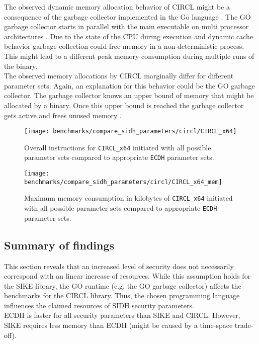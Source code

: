 The observed dynamic memory allocation behavior of \gls{CIRCL} might be a consequence of the garbage collector implemented in the Go language \parencite{Hudson:GGC}. The GO garbage collector starts in parallel with the main executable on multi processor architectures \parencite{go2020faq}. Due to the state of the CPU during execution and dynamic cache behavior garbage collection could free memory in a non-deterministic process. This might lead to a different peak memory consumption during multiple runs of the binary. \\
The observed memory allocations by \gls{CIRCL} marginally differ for different parameter sets. Again, an explanation for this behavior could be the GO garbage collector. The garbage collector knows an upper bound of memory that might be allocated by a binary. Once this upper bound is reached the garbage collector gets active and frees unused memory \parencite{Hudson:GGC}.

\begin{figure}[H]
  \centering
  \texttt{[image: benchmarks/compare\_sidh\_parameters/circl/CIRCL\_x64]}
  \caption[Overall instructions for all parameter sets via \texttt{CIRCL\_x64} compared to \texttt{ECDH}]
  {Overall instructions for \texttt{CIRCL\_x64} initiated with all possible parameter sets compared to appropriate \texttt{ECDH} parameter sets.}
  \label{fig:results_all_curves_circl}
\end{figure}

\begin{figure}[H]
  \centering
  \texttt{[image: benchmarks/compare\_sidh\_parameters/circl/CIRCL\_x64\_mem]}
  \caption[Maximum memory consumption for all parameter sets via \texttt{CIRCL\_x64}  compared to \texttt{ECDH}]
  {Maximum memory consumption in kilobytes of \texttt{CIRCL\_x64} initiated with all possible parameter sets compared to appropriate \texttt{ECDH} parameter sets.}
  \label{fig:results_all_curves_circl_mem}
\end{figure}

\subsection{Summary of findings}
This section reveals that an increased level of security does not necessarily correspond with an linear increase of resources. While this assumption holds for the \gls{SIKE} library, the GO runtime (e.g. the GO garbage collector) affects the benchmarks for the \gls{CIRCL} library. Thus, the chosen programming language influences the claimed resources of \gls{SIDH} security parameters.\\
\gls{ECDH} is faster for all security parameters than \gls{SIKE} and \gls{CIRCL}. However, \gls{SIKE} requires less memory than \gls{ECDH} (might be caused by a time-space trade-off).

